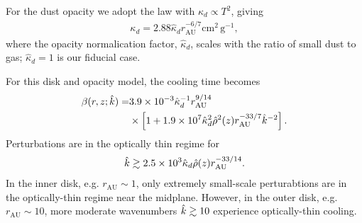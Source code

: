 For the dust opacity we adopt the \citet{bell94} law with $\kappa_d \propto T^2$, giving
\begin{align}
 \kappa_d %
    =
   2.88\hat{\kappa}_d r_\mathrm{AU}^{-6/7}\mathrm{cm}^2\,\mathrm{g}^{-1},   
\end{align}
where the opacity normalication factor, $\hat{\kappa}_d$, scales with the ratio of small dust to gas;  $\hat{\kappa}_d = 1$ is our fiducial case.


For this disk and opacity model, the cooling time becomes
\begin{align}\label{beta_mmsn_simp}
  \beta(r,z;\hat{k})\notag = &3.9\times10^{-3}\hat{\kappa}_d^{-1}
  r_\mathrm{AU}^{9/14}
  \notag\\ &\times \left[1 +
    1.9\times10^7\hat{\kappa}_d^{2}\hat{\rho}^2(z)r_\mathrm{AU}^{-33/7}\hat{k}^{-2}\right]. 
\end{align}
Perturbations are in the optically thin regime for
\begin{align}
  \hat{k}\gtrsim 2.5\times10^3\hat{\kappa}_d\hat{\rho}(z)r_\mathrm{AU}^{-33/14}.  
\end{align}
In the inner disk, e.g. $r_\mathrm{AU}\sim 1$, only
extremely small-scale perturabtions are in the optically-thin
regime near the midplane. However, in the outer disk, e.g. $r_\mathrm{AU}\sim 10$, 
 more moderate wavenumbers $\hat{k}\gtrsim 10$ experience optically-thin cooling.


